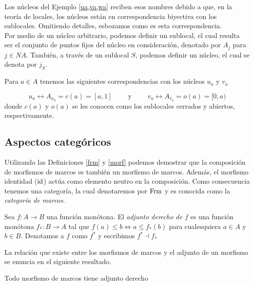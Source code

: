 \documentclass{comunicaciones}
\begin{document}
Los núcleos del Ejemplo \ref{ua,va,wa} reciben esos nombres debido a que, en la teoría de locales, los núcleos están en correspondencia biyectiva con los sublocales. Omitiendo detalles, esbozamos como es esta correspondencia.\\ 

Por medio de un núcleo arbitrario, podemos definir un sublocal, el cual resulta ser el conjunto de puntos fijos del núcleo en consideración, denotado por $A_j$ para $j\in NA$. También, a través de un sublocal $S$, podemos definir un núcleo, el cual se denota por $j_S$. 

\begin{obs}\label{ca y oa}
    Para $a\in A$ tenemos las siguientes correspondencias con los núcleos $u_a$ y $v_a$

    \[
    u_a\leftrightarrow A_{u_a}=c(a)=[a,1]\qquad \mbox{ y }\qquad v_a\leftrightarrow A_{v_a}=o(a)=[0,a)
    \]
    donde $c(a)$ y $o(a)$ se les conocen como los sublocales cerrados y abiertos, respectivamente.
\end{obs}
        
\subsection{Aspectos categóricos}
        Utilizando las Definiciones \ref{frm} y \ref{morf} podemos demostrar que la composición de morfismos de marcos es también un morfismo de marcos. Además, el morfismo identidad ($\mathrm{id}$) actúa como elemento neutro en la composición. Como consecuencia tenemos una categoría, la cual denotaremos por $\mathrm{Frm}$ y es conocida como la \emph{categoría de marcos}.
        
        \begin{dfn}\label{adjder}
        Sea $f:A\to B$ una función monótona. El \emph{adjunto derecho de $f$} es una función monótona $f_*:B\to A$ tal que $f(a)\leq b\Leftrightarrow a\leq f_*(b)$ para cualesquiera $a\in A$ y $b\in B$. Denotamos a $f$ como $f^*$ y escribimos \emph{$f^*\dashv f_*$}
        \end{dfn}
        
        La relación que existe entre los morfismos de marcos y el adjunto de un morfismo se enuncia en el siguiente resultado.
        
        \begin{prop}\label{Adjuntoder}
        Todo morfismo de marcos tiene adjunto derecho
        \end{prop}
        
\end{document}
